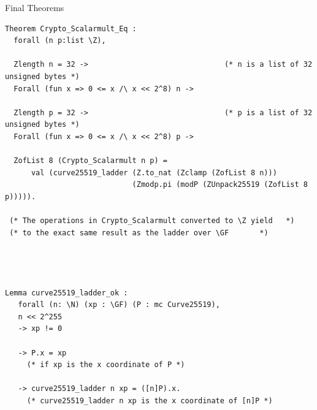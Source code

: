 \documentclass[8pt]{beamer}
\begin{document}
\begin{frame}[fragile]{Final Theorems}
\vspace{-0.5cm}
\begin{center}

%
%

\begin{lstlisting}[language=Coq]
Theorem Crypto_Scalarmult_Eq :
  forall (n p:list \Z),

  Zlength n = 32 ->                               (* n is a list of 32 unsigned bytes *)
  Forall (fun x => 0 <= x /\ x << 2^8) n ->

  Zlength p = 32 ->                               (* p is a list of 32 unsigned bytes *)
  Forall (fun x => 0 <= x /\ x << 2^8) p ->

  ZofList 8 (Crypto_Scalarmult n p) =
      val (curve25519_ladder (Z.to_nat (Zclamp (ZofList 8 n)))
                             (Zmodp.pi (modP (ZUnpack25519 (ZofList 8 p))))).

 (* The operations in Crypto_Scalarmult converted to \Z yield   *)
 (* to the exact same result as the ladder over \GF       *)




Lemma curve25519_ladder_ok :
   forall (n: \N) (xp : \GF) (P : mc Curve25519),
   n << 2^255
   -> xp != 0

   -> P.x = xp
     (* if xp is the x coordinate of P *)

   -> curve25519_ladder n xp = ([n]P).x.
     (* curve25519_ladder n xp is the x coordinate of [n]P *)
\end{lstlisting}
\end{center}
\end{frame}

%
%
%
\end{document}
